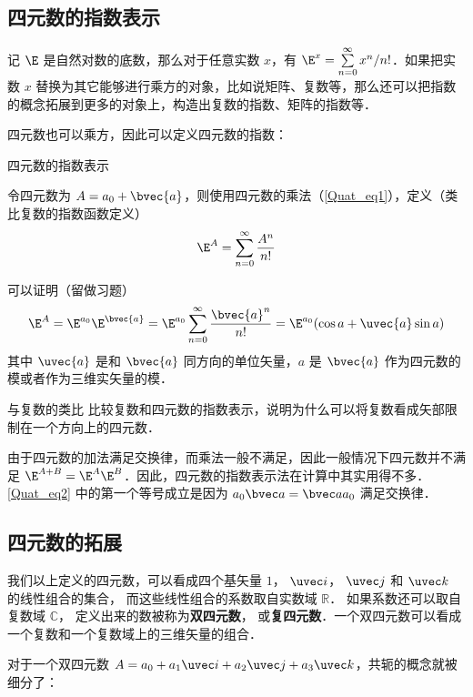 \subsection{四元数的指数表示}

记 $\E$ 是自然对数的底数，那么对于任意实数 $x$，有 $\E^x = \sum^\infty\limits_{n=0} x^n / n!$．如果把实数 $x$ 替换为其它能够进行乘方的对象，比如说矩阵、复数等，那么还可以把指数的概念拓展到更多的对象上，构造出复数的指数、矩阵的指数等．

四元数也可以乘方，因此可以定义四元数的指数：

\begin{definition}{四元数的指数表示}

令四元数为 $A=a_0+\bvec{a}$，则使用四元数的乘法（\autoref{Quat_eq1}），定义（类比复数的指数函数定义）
\begin{equation}\label{Quat_eq2}
\E^A = \sum^\infty\limits_{n=0}\frac{A^n}{n!}
\end{equation}
\end{definition}
可以证明（留做习题）
\begin{equation}
\E^A = \E^{a_0}\E^{\bvec{a}}=\E^{a_0}\sum^\infty\limits_{n=0}\frac{\bvec{a}^n}{n!}=\E^{a_0}(\cos{a}+ \uvec{a}\sin a)
\end{equation}
其中 $\uvec{a}$ 是和 $\bvec{a}$ 同方向的单位矢量，$a$ 是 $\bvec{a}$ 作为四元数的模或者作为三维实矢量的模．

\begin{exercise}{与复数的类比}
比较复数和四元数的指数表示，说明为什么可以将复数看成矢部限制在一个方向上的四元数．
\end{exercise}

由于四元数的加法满足交换律，而乘法一般不满足，因此一般情况下四元数并不满足 $\E^{A+B} = \E^A \E^B$．因此，四元数的指数表示法在计算中其实用得不多． \autoref{Quat_eq2} 中的第一个等号成立是因为 $a_0\bvec a = \bvec a a_0$ 满足交换律．

\subsection{四元数的拓展}

我们以上定义的四元数，可以看成四个基矢量 $1$， $\uvec i$， $\uvec j$ 和 $\uvec k$ 的线性组合的集合， 而这些线性组合的系数取自实数域 $\mathbb R$． 如果系数还可以取自复数域 $\mathbb C$， 定义出来的数被称为\textbf{双四元数}， 或\textbf{复四元数}．一个双四元数可以看成一个复数和一个复数域上的三维矢量的组合．

对于一个双四元数 $A=a_0+a_1 \uvec i+a_2\uvec j+a_3\uvec k$，共轭的概念就被细分了：

